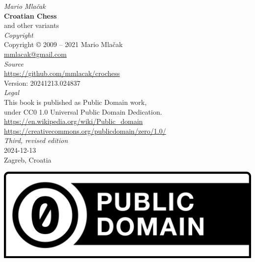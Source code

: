 \documentclass[a5paper,12pt]{book} %
\begin{document}
\thispagestyle{empty}
\vspace*{0.7\baselineskip}
\begin{center}
    \emph{Mario Mlačak} \\
    \textbf{Croatian Chess} \\
    and other variants \\ [2.0em]

    \emph{Copyright} \\
    Copyright \copyright \hspace{0.2ex} 2009 -- 2021 Mario Mlačak \\
    \href{mailto:mmlacak@gmail.com}{mmlacak@gmail.com} \\ [2.0em]

    \emph{Source} \\
    \href{https://github.com/mmlacak/crochess}{https://github.com/mmlacak/crochess} \\
    Version: 20241213.024837 \\ [2.0em] %

    \emph{Legal} \\
    This book is published as Public Domain work, \\
    under CC0 1.0 Universal Public Domain Dedication. \\
    \href{https://en.wikipedia.org/wiki/Public\_domain}{https://en.wikipedia.org/wiki/Public\_domain} \\
    \href{https://creativecommons.org/publicdomain/zero/1.0/}{https://creativecommons.org/publicdomain/zero/1.0/} \\ [2.0em]

    \emph{Third, revised edition} \\
    2024-12-13 \\ %
    Zagreb, Croatia

    \vfill
    \includegraphics[height=1.0\baselineskip, keepaspectratio=true]{CC0_button.svg.png}
    \vspace*{0.7\baselineskip}
\end{center}
\clearpage %
\end{document}
